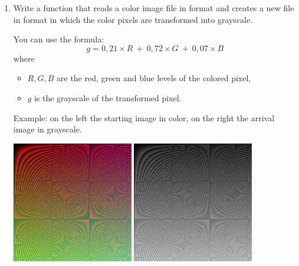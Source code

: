\documentclass[11pt,class=report,crop=false]{standalone}
\begin{document}
\begin{activite}
\begin{enumerate}
\item Write a function  that reads a color image file in  format and creates a new file in  format in which the color pixels are transformed into grayscale. 

You can use the formula: 
$$g = 0,21 \times R \  + \  0,72 \times G \  + \  0,07 \times B$$
where
\begin{itemize}
  \item $R,G,B$ are the red, green and blue levels of the colored pixel,
  \item $g$ is the grayscale of the transformed pixel.
\end{itemize}

Example: on the left the starting image in color, on the right the arrival image in grayscale.
\begin{center}
\includegraphics[scale=\myscale,scale=0.5]{screen-image_coul}\qquad\qquad
\includegraphics[scale=\myscale,scale=0.5]{screen-image_coul_gris}
\end{center} 


\end{enumerate}   
     
\end{activite}


\end{document}
